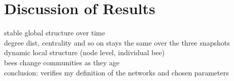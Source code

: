 \section{Discussion of Results}

stable global structure over time\\
degree dist, centrality and so on stays the same over the three snapshots\\
dynamic local structure (node level, individual bee)\\
bees change communities as they age\\
conclusion: verifies my definition of the networks and chosen parameters\\